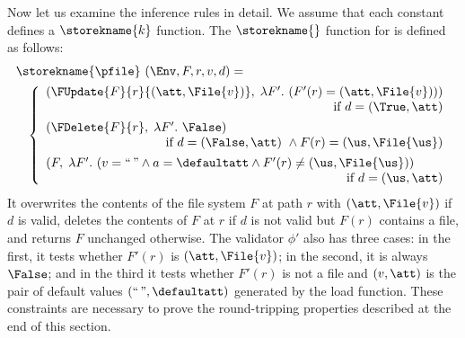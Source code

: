 Now let us examine the inference rules in detail. We assume that each
constant defines a $\storekname{k}$ function. The $\storekname{}$
function for \pfile{} is defined as follows:
%
\[
\begin{array}{l}
\storekname{\pfile}~(\Env,F,r,v,d) =\\[1ex]
\quad 
\left\{
\begin{array}{ll}
  (\FUpdate{F}{r}{(\att,\File{v})},            
  \; \lambda F'.~ (F'(r) = (\att,\File{v})))\\
  \hfill\text{if}~d = (\True,\att)\\[1ex]
  (\FDelete{F}{r},                             
  \; \lambda F'.~\False) \\
  \hfill\text{if}~d = (\False,\att)~\wedge F(r) = (\us,\File{\us})\\[1ex]
  (F,              
  \; \lambda F'.~ (v=\text{``}{\,}\text{''} \wedge a=\defaultatt \wedge F'(r) \neq (\us,\File{\us}))\\
  \hfill\text{if}~d = (\us,\att)
\end{array}\right.
\end{array}\]
%
It overwrites the contents of the file system $F$ at path $r$ with
$(\att,\File{v})$ if $d$ is valid, deletes the contents of $F$ at $r$
if $d$ is not valid but $F(r)$ contains a file, and returns $F$
unchanged otherwise. The validator $\phi'$ also has three cases: in
the first, it tests whether $F'(r)$ is $(\att,\File{v})$; in the
second, it is always $\False$; and in the third it tests whether
$F'(r)$ is not a file and $(v,\att)$ is the pair of default values
$(\text{``}{\,}\text{''}, \defaultatt)$ generated by the load
function. These constraints are necessary to prove the round-tripping
properties described at the end of this section.

